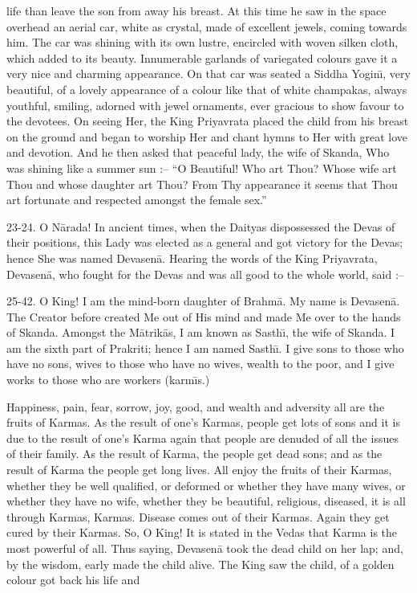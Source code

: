 life than leave the son from away his breast. At this time he saw in the space overhead an aerial car, white as crystal, made of excellent jewels, coming towards him. The car was shining with its own lustre, encircled with woven silken cloth, which added to its beauty. Innumerable garlands of variegated colours gave it a very nice and charming appearance. On that car was seated a Siddha Yogin\={\i}, very beautiful, of a lovely appearance of a colour like that of white champakas, always youthful, smiling, adorned with jewel ornaments, ever gracious to show favour to the devotees. On seeing Her, the King Priyavrata placed the child from his breast on the ground and began to worship Her and chant hymns to Her with great love and devotion. And he then asked that peaceful lady, the wife of Skanda, Who was shining like a summer sun :-- ``O Beautiful! Who art Thou? Whose wife art Thou and whose daughter art Thou? From Thy appearance it seems that Thou art fortunate and respected amongst the female sex.''

23-24. O N\=arada! In ancient times, when the Daityas dispossessed the Devas of their positions, this Lady was elected as a general and got victory for the Devas; hence She was named Devasen\=a. Hearing the words of the King Priyavrata, Devasen\=a, who fought for the Devas and was all good to the whole world, said :--

25-42. O King! I am the mind-born daughter of Brahm\=a. My name is Devasen\=a. The Creator before created Me out of His mind and made Me over to the hands of Skanda. Amongst the M\=atrik\=as, I am known as Sasth\={\i}, the wife of Skanda. I am the sixth part of Prakriti; hence I am named Sasth\={\i}. I give sons to those who have no sons, wives to those who have no wives, wealth to the poor, and I give works to those who are workers (karm\={\i}s.)

Happiness, pain, fear, sorrow, joy, good, and wealth and adversity all are the fruits of Karmas. As the result of one's Karmas, people get lots of sons and it is due to the result of one's Karma again that people are denuded of all the issues of their family. As the result of Karma, the people get dead sons; and as the result of Karma the people get long lives. All enjoy the fruits of their Karmas, whether they be well qualified, or deformed or whether they have many wives, or whether they have no wife, whether they be beautiful, religious, diseased, it is all through Karmas, Karmas. Disease comes out of their Karmas. Again they get cured by their Karmas. So, O King! It is stated in the Vedas that Karma is the most powerful of all. Thus saying, Devasen\=a took the dead child on her lap; and, by the wisdom, early made the child alive. The King saw the child, of a golden colour got back his life and

